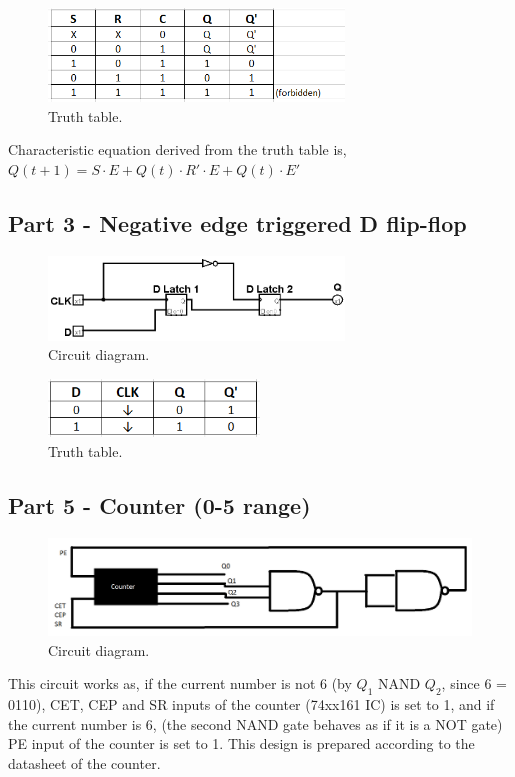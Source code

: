 \documentclass[pdftex,12pt,a4paper]{article}
\begin{document}
\begin{figure}[H]
	\centering
	\includegraphics[width=0.7\textwidth]{truthtable2.PNG}	
	\caption{Truth table.}
	\label{fig1}
\end{figure}

Characteristic equation derived from the truth table is, \(Q(t+1) = S \cdot E + Q(t) \cdot R' \cdot E + Q(t) \cdot E'\)

\subsection{Part 3 - Negative edge triggered D flip-flop}
\begin{figure}[H]
	\centering
	\includegraphics[width=0.7\textwidth]{circ3.PNG}	
	\caption{Circuit diagram.}
	\label{fig1}
\end{figure}

\begin{figure}[H]
	\centering
	\includegraphics[width=0.5\textwidth]{truthtable3.PNG}	
	\caption{Truth table.}
	\label{fig1}
\end{figure}

\subsection{Part 5 - Counter (0-5 range)}
\begin{figure}[H]
	\centering
	\includegraphics[width=1\textwidth]{circ5.PNG}	
	\caption{Circuit diagram.}
	\label{fig1}
\end{figure}
This circuit works as, if the current number is not 6 (by \(Q_1\) NAND \(Q_2\), since  6 = 0110), CET, CEP and SR inputs of the counter (74xx161 IC) is set to 1, and if the current number is 6, (the second NAND gate behaves as if it is a NOT gate) PE input of the counter is set to 1. This design is prepared according to the datasheet of the counter.
\end{document}

